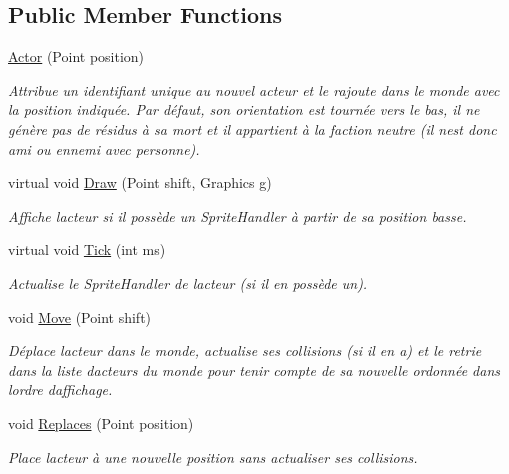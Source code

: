 \subsection*{Public Member Functions}
\begin{DoxyCompactItemize}
\item 
\hyperlink{class_tentacle_slicers_1_1actors_1_1_actor_ab544a07f9d12750f9896e4a604b699f1}{Actor} (Point position)
\begin{DoxyCompactList}\small\item\em Attribue un identifiant unique au nouvel acteur et le rajoute dans le monde avec la position indiquée. Par défaut, son orientation est tournée vers le bas, il ne génère pas de résidus à sa mort et il appartient à la faction neutre (il n\textquotesingle{}est donc ami ou ennemi avec personne). \end{DoxyCompactList}\item 
virtual void \hyperlink{class_tentacle_slicers_1_1actors_1_1_actor_ae06facc411c8cd44596e59020d131dd7}{Draw} (Point shift, Graphics g)
\begin{DoxyCompactList}\small\item\em Affiche l\textquotesingle{}acteur si il possède un Sprite\+Handler à partir de sa position basse. \end{DoxyCompactList}\item 
virtual void \hyperlink{class_tentacle_slicers_1_1actors_1_1_actor_a13e48a1ca022ce7c971c77f1354e3daf}{Tick} (int ms)
\begin{DoxyCompactList}\small\item\em Actualise le Sprite\+Handler de l\textquotesingle{}acteur (si il en possède un). \end{DoxyCompactList}\item 
void \hyperlink{class_tentacle_slicers_1_1actors_1_1_actor_ae52e3a2860b172692699d30c0f634041}{Move} (Point shift)
\begin{DoxyCompactList}\small\item\em Déplace l\textquotesingle{}acteur dans le monde, actualise ses collisions (si il en a) et le retrie dans la liste d\textquotesingle{}acteurs du monde pour tenir compte de sa nouvelle ordonnée dans l\textquotesingle{}ordre d\textquotesingle{}affichage. \end{DoxyCompactList}\item 
void \hyperlink{class_tentacle_slicers_1_1actors_1_1_actor_acab921d9a0542c58c4d6a635f8cf93f5}{Replaces} (Point position)
\begin{DoxyCompactList}\small\item\em Place l\textquotesingle{}acteur à une nouvelle position sans actualiser ses collisions. \end{DoxyCompactList}\item 

\end{DoxyCompactItemize}
